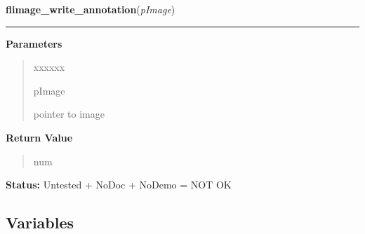 \hspace{.8\funcindent}\begin{boxedminipage}{\funcwidth}

    \raggedright \textbf{flimage\_write\_annotation}(\textit{pImage})

    \vspace{-1.5ex}

    \rule{\textwidth}{0.5\fboxrule}
\setlength{\parskip}{2ex}
\setlength{\parskip}{1ex}
      \textbf{Parameters}
      \vspace{-1ex}

      \begin{quote}
        \begin{Ventry}{xxxxxx}

          \item[pImage]

          pointer to image

        \end{Ventry}

      \end{quote}

      \textbf{Return Value}
    \vspace{-1ex}

      \begin{quote}
      num

      \end{quote}

\textbf{Status:} Untested + NoDoc + NoDemo = NOT OK



    \end{boxedminipage}



  \subsection{Variables}

